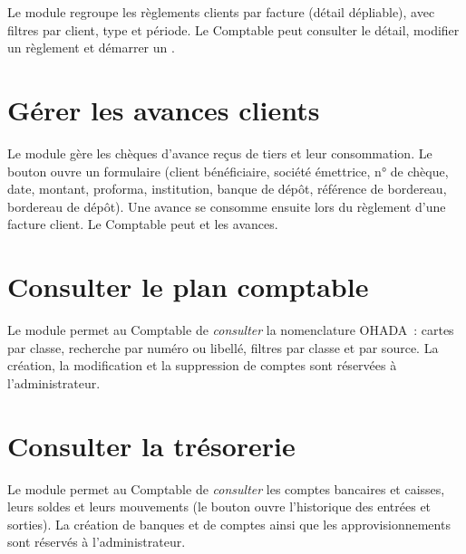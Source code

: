 Le module  regroupe les règlements clients par facture (détail dépliable), avec filtres par client, type et période. Le Comptable peut consulter le détail, modifier un règlement et démarrer un .


\section{Gérer les avances clients}

Le module  gère les chèques d'avance reçus de tiers et leur consommation. Le bouton  ouvre un formulaire (client bénéficiaire, société émettrice, n° de chèque, date, montant, proforma, institution, banque de dépôt, référence de bordereau, bordereau de dépôt). Une avance se consomme ensuite lors du règlement d'une facture client. Le Comptable peut  et  les avances.


\section{Consulter le plan comptable}

Le module  permet au Comptable de \emph{consulter} la nomenclature OHADA~: cartes par classe, recherche par numéro ou libellé, filtres par classe et par source. La création, la modification et la suppression de comptes sont réservées à l'administrateur.


\section{Consulter la trésorerie}

Le module  permet au Comptable de \emph{consulter} les comptes bancaires et caisses, leurs soldes et leurs mouvements (le bouton  ouvre l'historique des entrées et sorties). La création de banques et de comptes ainsi que les approvisionnements sont réservés à l'administrateur.


